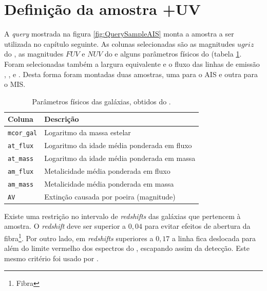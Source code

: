 
\section{Definição da amostra \STARLIGHT+UV}

A {\em query} mostrada na figura \ref{fig:QuerySampleAIS} monta a amostra a ser
utilizada no capítulo seguinte. As colunas selecionadas são as magnitudes
$ugriz$ do \SDSS, as magnitudes $FUV$ e $NUV$ do \galex e alguns parâmetros
físicos do \starlight (tabela \ref{tab:ParamFisicos}. Foram selecionadas também
a largura equivalente e o fluxo das linhas de emissão \Halpha, \Hbeta, \OIII e
\NII. Desta forma foram montadas duas amostras, uma para o AIS e outra para o
MIS.

\begin{table}
	\caption[Parâmetros físicos das galáxias utilizados na amostra.]
	{Parâmetros físicos das galáxias, obtidos do \starlight.}
	\begin{tabular}{l l}
		Coluna & Descrição \\
		\midrule
		{\tt mcor\_gal} & Logaritmo da massa estelar \\
		{\tt at\_flux}  & Logaritmo da idade média ponderada em fluxo \\
		{\tt at\_mass}  & Logaritmo da idade média ponderada em massa \\
		{\tt am\_flux}  & Metalicidade média ponderada em fluxo \\
		{\tt am\_mass}  & Metalicidade média ponderada em massa \\
		{\tt AV}       & Extinção causada por poeira (magnitude) \\
	\end{tabular}
	\label{tab:ParamFisicos}
\end{table}

Existe uma restrição no intervalo de {\em redshifts} das galáxias que pertencem
à amostra. O {\em redshift} deve ser superior a $0,04$ para evitar efeitos de
abertura da fibra\footnote{Fibra\fixme}. Por outro lado, em {\em redshifts}
superiores a $0,17$ a linha \NII fica deslocada para além do limite vermelho dos
espectros do \SDSS, escapando assim da detecção. Este mesmo critério foi usado
por \citet{CidFernandes2011}.



